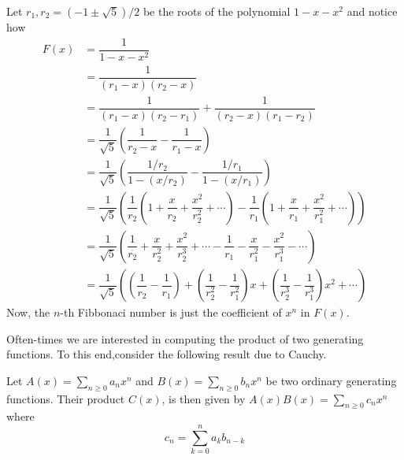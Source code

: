 \begin{solution}
Let $r_1,r_2 = (-1\pm\sqrt{5})/2$ be the roots of the polynomial $1-x-x^2$ and notice how
\begin{align*}
    F(x) &= \dfrac{1}{1-x-x^2} \\
    &= \dfrac{1}{(r_1-x)(r_2-x)} \\
    &= \dfrac{1}{(r_1-x)(r_2-r_1)}+\dfrac{1}{(r_2-x)(r_1-r_2)} \\
    &= \dfrac{1}{\sqrt{5}}\left(\dfrac{1}{r_2-x}-\dfrac{1}{r_1-x}\right) \\
    &= \dfrac{1}{\sqrt{5}} \left(\dfrac{1/r_2}{1-(x/r_2)}-\dfrac{1/r_1}{1-(x/r_1)}\right) \\
    &= \dfrac{1}{\sqrt{5}} \left(\dfrac{1}{r_2}\left(1+\dfrac{x}{r_2}+\dfrac{x^2}{r_2^2}+\cdots\right)-\dfrac{1}{r_1}\left(1+\dfrac{x}{r_1}+\dfrac{x^2}{r_1^2}+\cdots\right)\right) \\
    &= \dfrac{1}{\sqrt{5}}\left(\dfrac{1}{r_2}+\dfrac{x}{r_2^2}+\dfrac{x^2}{r_2^3}+\cdots - \dfrac{1}{r_1}-\dfrac{x}{r_1^2}-\dfrac{x^2}{r_1^3}-\cdots\right) \\
    &= \dfrac{1}{\sqrt{5}}\left(\left(\dfrac{1}{r_2}-\dfrac{1}{r_1}\right)+\left(\dfrac{1}{r_2^2}-\dfrac{1}{r_1^2}\right)x+\left(\dfrac{1}{r_2^3}-\dfrac{1}{r_1^3}\right)x^2+\cdots\right)
\end{align*}
Now, the $n$-th Fibbonaci number is just the coefficient of $x^n$ in $F(x)$. 
\end{solution}
Often-times we are interested in computing the product of two generating functions. To this end,consider the following result due to Cauchy. 
\begin{claim}
Let $A(x) = \sum_{n\geq 0}a_nx^n$ and $B(x)=\sum_{n\geq 0}b_nx^n$ be two ordinary generating functions. Their product $C(x)$, is then given by $A(x)B(x)=\sum_{n\geq 0}c_nx^n$ where \[
c_n = \sum_{k=0}^{n}a_kb_{n-k}
\]
\end{claim}
\endinput